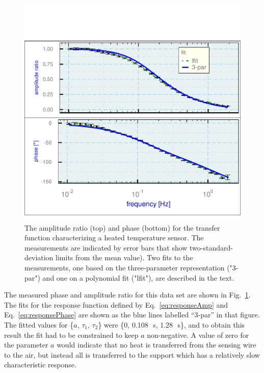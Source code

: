 \documentclass[amt, manuscript]{copernicus}
\begin{document}
\begin{figure}

\begin{center}\includegraphics[width=12cm]{figure/fig4} \end{center}

\caption[The amplitude ratio and phase for the transfer function characterizing a heated temperature sensor. ]{The amplitude ratio (top) and phase (bottom) for the transfer function characterizing
a heated temperature sensor. The measurements are indicated
by error bars that show two-standard-deviation limits from the mean
value). Two fits to the measurements, one based on the three-parameter
representation ("3-par") and one on a polynomial fit ("lfit"),
are described in the text.{\label{fig:GVHARCO}}}
\end{figure}

The measured phase and amplitude ratio for this data set are shown in
Fig.~\ref{fig:GVHARCO}. The fits for the response function defined by
Eq.~\eqref{eq:responseAmp} and Eq.~\eqref{eq:responsePhase} are shown as
the blue lines labelled ``3-par'' in that figure. The fitted values for
\{\(a,\,\tau_{1},\,\tau_{2}\)\} were \{0, 0.108\unit{\,s},
1.28\unit{\,s}\}, and to obtain this result the fit had to be
constrained to keep \(a\) non-negative. A value of zero for the
parameter \(a\) would indicate that no heat is transferred from the
sensing wire to the air, but instead all is transferred to the support
which has a relatively slow characteristic response.
\end{document}
